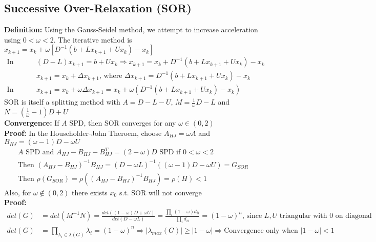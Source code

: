 \documentclass{article}
\newcommand{\abs}[1]{\lvert#1\rvert}
\begin{document}
\subsection{Successive Over-Relaxation (SOR)}
\textbf{Definition:} Using the Gauss-Seidel method, we attempt to increase acceleration using $0<\omega<2$. The  iterative method is $x_{k+1} = x_k + \omega\left[D^{-1}(b + Lx_{k+1} + Ux_k) - x_k\right]$
\begin{align*}
    \textrm{In Gauss-Seidel: }& (D - L)x_{k+1} = b + Ux_k \Longrightarrow x_{k+1} = x_k + D^{-1}(b + Lx_{k+1} + Ux_k) - x_k\\
    & x_{k+1} = x_k + \Delta x_{k+1} \textrm{, where } \Delta x_{k+1} = D^{-1}(b + Lx_{k+1} + Ux_k) - x_k\\
    \textrm{In SOC: }& x_{k+1} = x_k + \omega\Delta x_{k+1} = x_k + \omega(D^{-1}(b + Lx_{k+1} + Ux_k) - x_k)
\end{align*}
SOR is itself a splitting method with $A = D - L - U$,  $M = \frac{1}{\omega}D - L$ and $N = (\frac{1}{\omega} - 1)D + U$\\
\textbf{Convergence:} If $A$ SPD, then SOR converges for any $\omega \in (0, 2)$\\
\textbf{Proof:}
In the Householder-John Theroem, choose $A_{HJ} = \omega A$ and $B_{HJ} = (\omega - 1)D - \omega U$
\begin{align*}
    A \textrm{ SPD and } A_{HJ} - B_{HJ} - B_{HJ}^T = (2-\omega)D \textrm{ SPD if } 0 < \omega < 2\\
    \textrm{Then }(A_{HJ} - B_{HJ})^{-1}B_{HJ} = (D -\omega L)^{-1}((\omega - 1)D - \omega U) = G_{SOR}\\
    \textrm{Then } \rho(G_{SOR}) = \rho((A_{HJ} - B_{HJ})^{-1}B_{HJ}) = \rho(H)<1
\end{align*}
Also, for $\omega \notin (0, 2)$ there exists $x_0$ s.t. SOR will not converge\\
\textbf{Proof:}
\begin{align*}
    det(G) &= det(M^{-1}N) = \frac{det((1-\omega)D + \omega U)}{det(D - \omega L)} = \frac{\prod_i(1-\omega)d_{ii}}{\prod_i d_{ii}} = (1-\omega)^n \textrm{, since $L, U$ triangular with 0 on diagonal}\\
    det(G) &= \prod_{\lambda_i \in \lambda(G)}\lambda_i = (1-\omega)^n \Longrightarrow \abs{\lambda_{max}(G)}\geq \abs{1 - \omega} \Longrightarrow \textrm{Convergence only when } \abs{1 - \omega} < 1
\end{align*}
\end{document}
